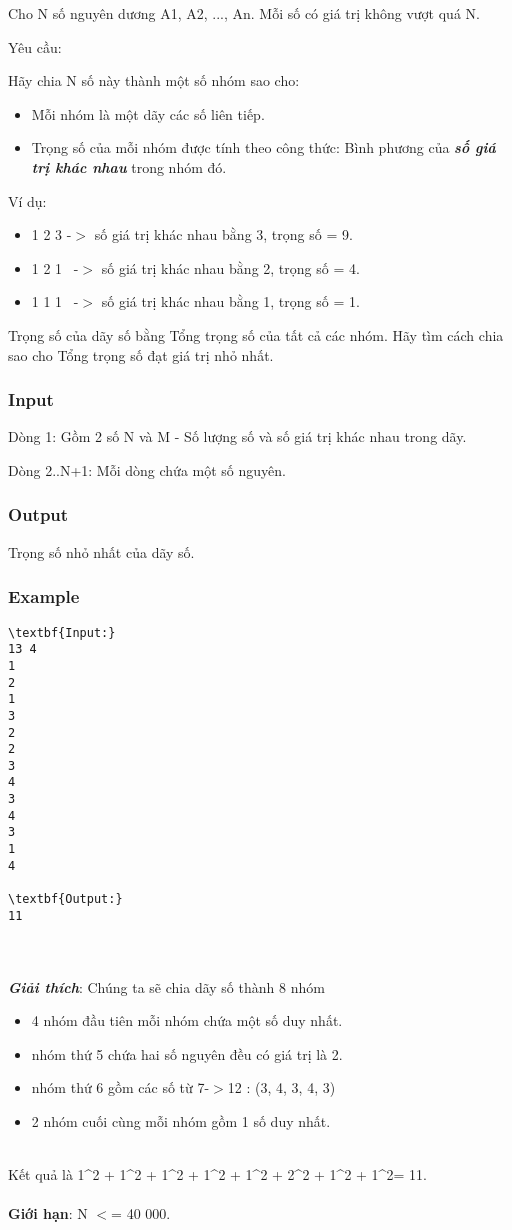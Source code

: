 

Cho N số nguyên dương A1, A2, ..., An. Mỗi số có giá trị không vượt quá N.

Yêu cầu:

Hãy chia N số này thành một số nhóm sao cho:
\begin{itemize}
	\item Mỗi nhóm là một dãy các số liên tiếp.
	\item Trọng số của mỗi nhóm được tính theo công thức: Bình phương của \textbf{\emph{ số giá trị khác nhau }} trong nhóm đó.
\end{itemize}

Ví dụ:
\begin{itemize}
	\item 1 2 3 -$>$ số giá trị khác nhau bằng 3, trọng số = 9.
	\item 1 2 1  -$>$ số giá trị khác nhau bằng 2, trọng số = 4.
	\item 1 1 1  -$>$ số giá trị khác nhau bằng 1, trọng số = 1.
\end{itemize}

Trọng số của dãy số bằng Tổng trọng số của tất cả các nhóm. Hãy tìm cách chia sao cho Tổng trọng số đạt giá trị nhỏ nhất.

\subsubsection{Input}

Dòng 1: Gồm 2 số N và M - Số lượng số và số giá trị khác nhau trong dãy.

Dòng 2..N+1: Mỗi dòng chứa một số nguyên.

\subsubsection{Output}

Trọng số nhỏ nhất của dãy số.

\subsubsection{Example}
\begin{verbatim}
\textbf{Input:}
13 4
1
2
1
3
2
2
3
4
3
4
3
1
4

\textbf{Output:}
11\end{verbatim}


\\
\\\textbf{\emph{Giải thích}}: Chúng ta sẽ chia dãy số thành 8 nhóm
\begin{itemize}
	\item 4 nhóm đầu tiên mỗi nhóm chứa một số duy nhất.
	\item nhóm thứ 5 chứa hai số nguyên đều có giá trị là 2.
	\item nhóm thứ 6 gồm các số từ 7-$>$12 : (3, 4, 3, 4, 3)
	\item 2 nhóm cuối cùng mỗi nhóm gồm 1 số duy nhất.
\end{itemize}


\\Kết quả là 1\textasciicircum2 + 1\textasciicircum2 + 1\textasciicircum2 + 1\textasciicircum2 + 1\textasciicircum2 + 2\textasciicircum2 + 1\textasciicircum2 + 1\textasciicircum2= 11.
\\
\\\textbf{Giới hạn}: N $<$= 40 000.